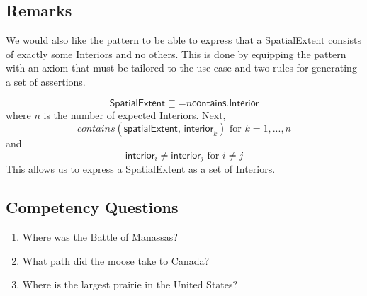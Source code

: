 \subsection{Remarks}
\label{rem:Spatial}
We would also like the pattern to be able to express that a \textsf{SpatialExtent} consists of exactly some \textsf{Interiors} and no others. This is done by equipping the pattern with an axiom that must be tailored to the use-case and two rules for generating a set of assertions.

\begin{equation}
\textsf{SpatialExtent} \sqsubseteq \mathord{=}n\textsf{contains.Interior}
\end{equation}
where $n$ is the number of expected \textsf{Interiors}. Next,
$$\textit{contains}(\textsf{spatialExtent, interior}_k) \text{ for } k=1,...,n$$
and
$$\textsf{interior}_i \not = \textsf{interior}_j \text{ for } i \not = j$$
This allows us to express a \textsf{SpatialExtent} as a set of \textsf{Interiors}.
\subsection{Competency Questions}
\label{cqs:Spatial}
\begin{enumerate}[CQ1.]
\item Where was the Battle of Manassas?
\item What path did the moose take to Canada?
\item Where is the largest prairie in the United States?
\end{enumerate}

\newpage
